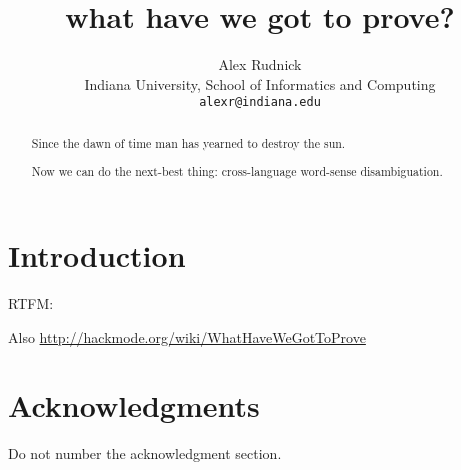 \documentclass{article}
\title{what have we got to prove?}
\author{Alex Rudnick \\
	    Indiana University, School of Informatics and Computing \\
	    {\tt alexr@indiana.edu}}
\date{}
\begin{document}
\maketitle
\begin{abstract}
Since the dawn of time man has yearned to destroy the sun.

Now we can do the next-best thing: cross-language word-sense disambiguation.
\end{abstract}

\section{Introduction}
RTFM: \cite{big} \cite{small}

Also \url{http://hackmode.org/wiki/WhatHaveWeGotToProve}

\section*{Acknowledgments}

Do not number the acknowledgment section.


{}
\end{document}
